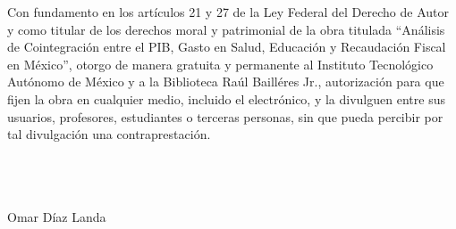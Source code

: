 \thispagestyle{empty}
\noindent Con fundamento en los artí­culos 21 y 27 de la Ley Federal del Derecho de Autor y como titular de los derechos moral y patrimonial de la obra titulada ``Análisis de Cointegración entre el PIB, Gasto en Salud, Educación y Recaudación Fiscal en México'', otorgo de manera gratuita y permanente al Instituto Tecnológico Autónomo de México y a la Biblioteca Raúl Bailléres Jr., autorización para que fijen la obra en cualquier medio, incluido el electrónico, y la divulguen entre sus usuarios, profesores, estudiantes o terceras personas, sin que pueda percibir por tal divulgación una contraprestación.\\\\\\\\

\begin{center} 
Omar Díaz Landa\\
\par\noindent\makebox[2.5in]{ }\\
\vspace{10mm}
\par\noindent\makebox[2.5in]{\hrulefill}\\
\par\noindent{}\\
\par\noindent\makebox[2.5in]{ }\\
\vspace{10mm}
\par\noindent\makebox[2.5in]{\hrulefill}\\
\par\noindent{}\\
\end{center}
\clearpage %
